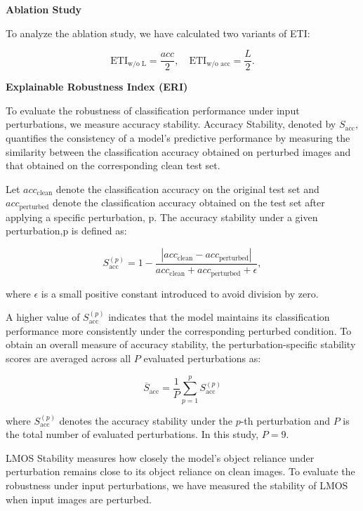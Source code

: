 \documentclass[a4paper,fleqn]{cas-dc}
\begin{document}
\noindent\textbf{Ablation Study}

To analyze the ablation study, we have calculated two variants of ETI:

\[
\mathrm{ETI}_{\text{w/o L}} = \frac{acc}{2}, \quad
\mathrm{ETI}_{\text{w/o acc}} = \frac{L}{2}.
\]


\noindent\textbf{Explainable Robustness Index (ERI)}

To evaluate the robustness of classification performance under input perturbations, we measure accuracy stability. Accuracy Stability, denoted by $S_{\text{acc}}$, quantifies the consistency of a model's predictive performance by measuring the similarity between the classification accuracy obtained on perturbed images and that obtained on the corresponding clean test set.

Let $acc_{\text{clean}}$ denote the classification accuracy on the original test set and $acc_{\text{perturbed}}$ denote the classification accuracy obtained on the test set after applying a specific perturbation, p. The accuracy stability under a given perturbation,p is defined as:

\begin{equation}
S_{\text{acc}}^{(p)} = 1 - \frac{|acc_{\text{clean}} - acc_{\text{perturbed}}|}
{acc_{\text{clean}} + acc_{\text{perturbed}} + \epsilon},
\end{equation}

where $\epsilon$ is a small positive constant introduced to avoid division by zero.

A higher value of $S_{\text{acc}}^{(p)}$ indicates that the model maintains its classification performance more consistently under the corresponding perturbed condition. To obtain an overall measure of accuracy stability, the perturbation-specific stability scores are averaged across all $P$ evaluated perturbations as:

\begin{equation}
\overline{S}_{\text{acc}}
=
\frac{1}{P}
\sum_{p=1}^{p}
S_{\text{acc}}^{(p)}
\end{equation}

where $S_{\text{acc}}^{(p)}$ denotes the accuracy stability under the $p$-th perturbation and $P$ is the total number of evaluated perturbations. In this study, $P=9$.

LMOS Stability measures how closely the model's object reliance under perturbation remains close to its object reliance on clean images.
To evaluate the robustness under input perturbations, we have measured the stability of LMOS when input images are perturbed.
\end{document}

